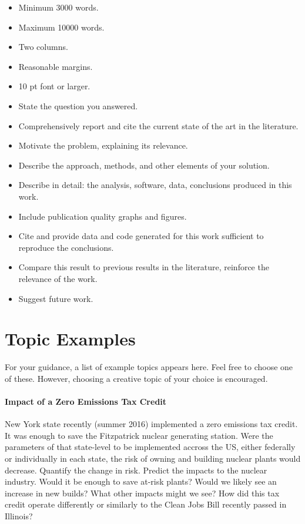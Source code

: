 \documentclass[12pts, answers]{exam}
\begin{document}
\begin{questions}
\begin{itemize}
\item Minimum 3000 words.
\item Maximum 10000 words.
\item Two columns.
\item Reasonable margins.
\item 10 pt font or larger.
\item State the question you answered.
\item Comprehensively report and cite the current state of the art in the literature.
\item Motivate the problem, explaining its relevance.
\item Describe the approach, methods, and other elements of your solution.
\item Describe in detail: the analysis, software, data, conclusions produced in this work.
\item Include publication quality graphs and figures.
\item Cite and provide data and code generated for this work sufficient to reproduce the conclusions.
\item Compare this result to previous results in the literature, reinforce the relevance of the work. 
\item Suggest future work.
\end{itemize}

\end{questions}


\section{Topic Examples}
For your guidance, a list of example topics appears here.
Feel free to choose one of these.  However, choosing a creative topic 
of your choice is encouraged.  

\paragraph{Impact of a Zero Emissions Tax Credit} New York state recently 
(summer 2016) implemented a zero emissions tax credit. It was enough to save 
the Fitzpatrick nuclear generating station. Were the parameters of that 
state-level to be implemented accross the US, either federally or individually 
in each state, the risk of owning and building nuclear plants would decrease. 
Quantify the change in risk. Predict the impacts to the nuclear industry. Would 
it be enough to save at-risk plants? Would we likely see an increase in new 
builds? What other impacts might we see? How did this tax credit operate 
differently or similarly to the Clean Jobs Bill recently passed in Illinois?
\end{document}
